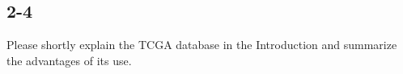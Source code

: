 \documentclass[preprint,12pt]{elsarticle}
\newenvironment{MyColorPar}[1]{%
    \leavevmode\color{#1}\ignorespaces%
}{%
}%
\begin{document}
\begin{MyColorPar}{blue}
\end{MyColorPar}


\subsection*{2-4}
Please shortly explain the TCGA database in the Introduction and summarize the advantages of its use.
\end{document}
